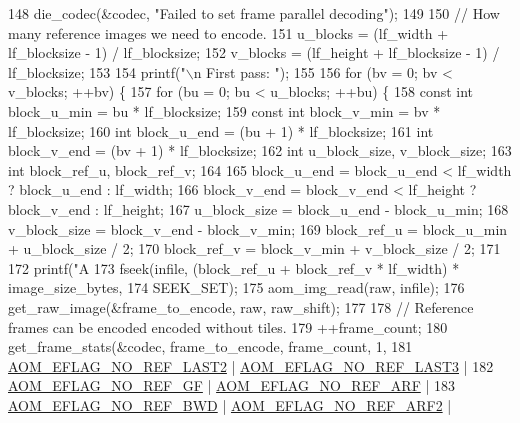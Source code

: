 \begin{DoxyCodeInclude}
{148     die\_codec(&codec, \textcolor{stringliteral}{"Failed to set frame parallel decoding"});
149 
150   \textcolor{comment}{// How many reference images we need to encode.}
151   u\_blocks = (lf\_width + lf\_blocksize - 1) / lf\_blocksize;
152   v\_blocks = (lf\_height + lf\_blocksize - 1) / lf\_blocksize;
153 
154   printf(\textcolor{stringliteral}{"\(\backslash\)n First pass: "});
155 
156   \textcolor{keywordflow}{for} (bv = 0; bv < v\_blocks; ++bv) \{
157     \textcolor{keywordflow}{for} (bu = 0; bu < u\_blocks; ++bu) \{
158       \textcolor{keyword}{const} \textcolor{keywordtype}{int} block\_u\_min = bu * lf\_blocksize;
159       \textcolor{keyword}{const} \textcolor{keywordtype}{int} block\_v\_min = bv * lf\_blocksize;
160       \textcolor{keywordtype}{int} block\_u\_end = (bu + 1) * lf\_blocksize;
161       \textcolor{keywordtype}{int} block\_v\_end = (bv + 1) * lf\_blocksize;
162       \textcolor{keywordtype}{int} u\_block\_size, v\_block\_size;
163       \textcolor{keywordtype}{int} block\_ref\_u, block\_ref\_v;
164 
165       block\_u\_end = block\_u\_end < lf\_width ? block\_u\_end : lf\_width;
166       block\_v\_end = block\_v\_end < lf\_height ? block\_v\_end : lf\_height;
167       u\_block\_size = block\_u\_end - block\_u\_min;
168       v\_block\_size = block\_v\_end - block\_v\_min;
169       block\_ref\_u = block\_u\_min + u\_block\_size / 2;
170       block\_ref\_v = block\_v\_min + v\_block\_size / 2;
171 
172       printf(\textcolor{stringliteral}{"A%
173       fseek(infile, (block\_ref\_u + block\_ref\_v * lf\_width) * image\_size\_bytes,
174             SEEK\_SET);
175       aom\_img\_read(raw, infile);
176       get\_raw\_image(&frame\_to\_encode, raw, raw\_shift);
177 
178       \textcolor{comment}{// Reference frames can be encoded encoded without tiles.}
179       ++frame\_count;
180       get\_frame\_stats(&codec, frame\_to\_encode, frame\_count, 1,
181                       \hyperlink{group__aom__encoder_ga50c2560ca6670298cfc614ecae96a391}{AOM\_EFLAG\_NO\_REF\_LAST2} | 
      \hyperlink{group__aom__encoder_gaa4bc8ae2b977b73f0ef57ba428ca1d2c}{AOM\_EFLAG\_NO\_REF\_LAST3} |
182                           \hyperlink{group__aom__encoder_gaaef6fe76991abf87edd2f296eee999f8}{AOM\_EFLAG\_NO\_REF\_GF} | 
      \hyperlink{group__aom__encoder_ga9e2f989737d63ddf4e987a525d186a46}{AOM\_EFLAG\_NO\_REF\_ARF} |
183                           \hyperlink{group__aom__encoder_ga758649aa6cd9fefb15ad888489884a38}{AOM\_EFLAG\_NO\_REF\_BWD} | 
      \hyperlink{group__aom__encoder_gad04799a74215e1b9609f7ccd1766f8c9}{AOM\_EFLAG\_NO\_REF\_ARF2} |
}}
\end{DoxyCodeInclude}
